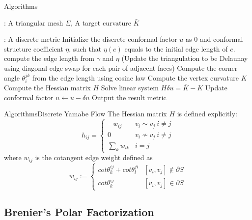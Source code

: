\documentclass{beamer}
\theoremstyle{definition}
\begin{document}
\begin{frame}{Algorithms}
\begin{algorithm}[H]

\begin{algorithmic}[1]
	\REQUIRE: A triangular mesh $\Sigma$, A target curvature $\bar{K}$

	\ENSURE: A discrete metric
  	\STATE Initialize the discrete conformal factor $u$ as 0 and conformal structure coefficient $\eta$, such that $\eta(e)$ equals to the initial edge length of $e$.
  	\STATE compute the edge length from $\gamma$ and $\eta$
  	\STATE (Update the triangulation to be Delaunay using diagonal edge swap for each pair of adjacent faces)
  	\STATE Compute the corner angle $\theta^{jk}_i$ from the edge length using cosine law
  	\STATE Compute the vertex curvature $K$
  	\STATE Compute the Hessian matrix $H$
  	\STATE Solve linear system $H\delta u=\bar{K}-K$
  	\STATE Update conformal factor $u\leftarrow u-\delta u$
  	\ENDWHILE
  	\STATE Output the result metric
\end{algorithmic}
\caption{Discrete Surface Yamabe Flow}
\end{algorithm}
\end{frame}

\begin{frame}{Algorithms}{Discrete Yamabe Flow}
The Hessian matrix $H$ is defined explicitly:
\[
	h_{ij} = \begin{cases}
			-w_{ij} & v_i\sim v_j\  i\neq j \\
			0  &v_i\nsim v_j \ i\neq j \\
			\sum_k w_{ik}  &i=j
		\end{cases}
\]
where $w_{ij}$ is the cotangent edge weight defined as
\[
w_{ij} := \begin{cases}
		cot\theta^{ij}_k+cot\theta^{ji}_l &[v_i,v_j]\notin \partial S \\
		cot\theta^{ij}_k &[v_i,v_j]\in \partial S
	\end{cases}
\]
\end{frame}


\subsection{Brenier's Polar Factorization}
\end{document}
